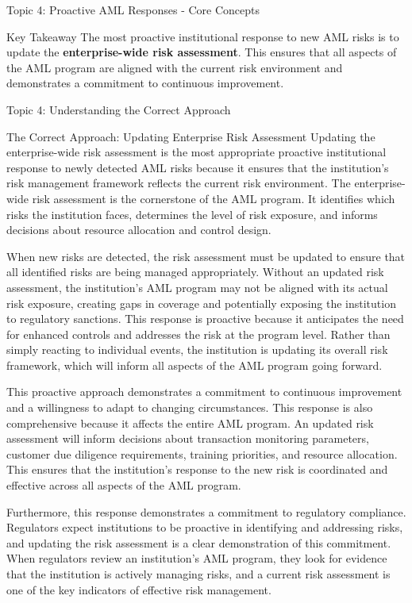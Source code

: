 \documentclass[5pt]{beamer}
\begin{document}
\begin{frame}{Topic 4: Proactive AML Responses - Core Concepts}
		\begin{alertblock}{Key Takeaway}
			\tiny The most proactive institutional response to new AML risks is to update the \textbf{enterprise-wide risk assessment}. This ensures that all aspects of the AML program are aligned with the current risk environment and demonstrates a commitment to continuous improvement.
		\end{alertblock}
	\end{frame}
	
	\begin{frame}{Topic 4: Understanding the Correct Approach}
		\begin{block}{\tiny The Correct Approach: Updating Enterprise Risk Assessment}
			\tiny Updating the enterprise-wide risk assessment is the most appropriate proactive institutional response to newly detected AML risks because it ensures that the institution's risk management framework reflects the current risk environment. The enterprise-wide risk assessment is the cornerstone of the AML program. It identifies which risks the institution faces, determines the level of risk exposure, and informs decisions about resource allocation and control design.
			
			When new risks are detected, the risk assessment must be updated to ensure that all identified risks are being managed appropriately. Without an updated risk assessment, the institution's AML program may not be aligned with its actual risk exposure, creating gaps in coverage and potentially exposing the institution to regulatory sanctions. This response is proactive because it anticipates the need for enhanced controls and addresses the risk at the program level. Rather than simply reacting to individual events, the institution is updating its overall risk framework, which will inform all aspects of the AML program going forward.
			
			This proactive approach demonstrates a commitment to continuous improvement and a willingness to adapt to changing circumstances. This response is also comprehensive because it affects the entire AML program. An updated risk assessment will inform decisions about transaction monitoring parameters, customer due diligence requirements, training priorities, and resource allocation. This ensures that the institution's response to the new risk is coordinated and effective across all aspects of the AML program.
			
			Furthermore, this response demonstrates a commitment to regulatory compliance. Regulators expect institutions to be proactive in identifying and addressing risks, and updating the risk assessment is a clear demonstration of this commitment. When regulators review an institution's AML program, they look for evidence that the institution is actively managing risks, and a current risk assessment is one of the key indicators of effective risk management.
		\end{block}
	\end{frame}
	
\end{document}
